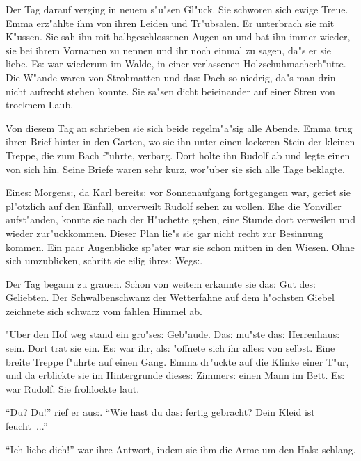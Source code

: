 \documentclass[oneside,12pt]{book}
\newcommand{\s}{s:}%
\begin{document}
Der Tag darauf verging in neuem s"u"sen Gl"uck. Sie schworen sich
ewige Treue. Emma erz"ahlte ihm von ihren Leiden und Tr"ubsalen.
Er unterbrach sie mit K"ussen. Sie sah ihn mit halbgeschlossenen
Augen an und bat ihn immer wieder, sie bei ihrem Vornamen zu
nennen und ihr noch einmal zu sagen, da"s er sie liebe. E{\s} war
wiederum im Walde, in einer verlassenen Holzschuhmacherh"utte. Die
W"ande waren von Strohmatten und da{\s} Dach so niedrig, da"s man
drin nicht aufrecht stehen konnte. Sie sa"sen dicht beieinander
auf einer Streu von trocknem Laub.

Von diesem Tag an schrieben sie sich beide regelm"a"sig alle
Abende. Emma trug ihren Brief hinter in den Garten, wo sie ihn
unter einen lockeren Stein der kleinen Treppe, die zum Bach
f"uhrte, verbarg. Dort holte ihn Rudolf ab und legte einen von
sich hin. Seine Briefe waren sehr kurz, wor"uber sie sich alle
Tage beklagte.

Eine{\s} Morgen{\s}, da Karl bereit{\s} vor Sonnenaufgang
fortgegangen war, geriet sie pl"otzlich auf den Einfall,
unverweilt Rudolf sehen zu wollen. Ehe die Yonviller aufst"anden,
konnte sie nach der H"uchette gehen, eine Stunde dort verweilen
und wieder zur"uckkommen. Dieser Plan lie"s sie gar nicht recht
zur Besinnung kommen. Ein paar Augenblicke sp"ater war sie schon
mitten in den Wiesen. Ohne sich umzublicken, schritt sie eilig
ihre{\s} Weg{\s}.

Der Tag begann zu grauen. Schon von weitem erkannte sie da{\s} Gut
de{\s} Geliebten. Der Schwalbenschwanz der Wetterfahne auf dem
h"ochsten Giebel zeichnete sich schwarz vom fahlen Himmel ab.

"Uber den Hof weg stand ein gro"se{\s} Geb"aude. Da{\s} mu"ste
da{\s} Herrenhau{\s} sein. Dort trat sie ein. E{\s} war ihr,
al{\s} "offnete sich ihr alle{\s} von selbst. Eine breite Treppe
f"uhrte auf einen Gang. Emma dr"uckte auf die Klinke einer T"ur,
und da erblickte sie im Hintergrunde diese{\s} Zimmer{\s} einen
Mann im Bett. E{\s} war Rudolf. Sie frohlockte laut.

"`Du? Du!"' rief er au{\s}. "`Wie hast du da{\s} fertig gebracht?
Dein Kleid ist feucht~..."'

"`Ich liebe dich!"' war ihre Antwort, indem sie ihm die Arme um
den Hal{\s} schlang.
\end{document}
